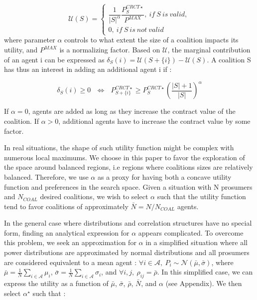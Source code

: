\documentclass[journal]{IEEEtran}
\begin{document}
\begin{equation}
\mathcal{U}(S) = \left\{ \begin{array}{lll}
							\dfrac{1}{|S|^{\alpha}} \dfrac{ P_{S}^{CRCT \star} }{P^{MAX}},\ if\ S\ is\ valid, \\
							0,\ if\ S\ is\ not\ valid
						 \end{array}
				  \right.
\end{equation}
where parameter $ \alpha $ controls to what extent the size of a coalition impacts its utility, and $ P^{MAX} $ is a normalizing factor. Based on $ \mathcal{U} $, the marginal contribution of an agent i can be expressed as $ \delta_{S}(i) = \mathcal{U}(S+\{i\}) - \mathcal{U}(S) $. A coalition S has thus an interest in adding an additional agent i if : 

\begin{equation}
\delta_{S}(i) \geq 0 \ \ \ \Leftrightarrow \ \ \ P_{S+\{i\}}^{CRCT \star} \geq P_{S}^{CRCT \star} \left( \dfrac{|S|+1}{|S|} \right)^{\alpha}
\label{eq:marginal_benefit}
\end{equation}

If $ \alpha = 0 $, agents are added as long as they increase the contract value of the coalition. If $ \alpha > 0 $, additional agents have to increase the contract value by some factor. 

In real situations, the shape of such utility function might be complex with numerous local maximums. We choose in this paper to favor the exploration of the space around balanced regions, i.e regions where coalitions sizes are relatively balanced. Therefore, we use $ \alpha $ as a proxy for having both a concave utility function and preferences in the search space. Given a situation with N prosumers and $ N_{COAL} $ desired coalitions, we wish to select $ \alpha $ such that the utility function tend to favor coalitions of approximately $ \bar{N}=N/N_{COAL} $ agents.

In the general case where distributions and correlation structures have no special form, finding an analytical expression for $ \alpha $ appears complicated. To overcome this problem, we seek an approximation for $ \alpha $ in a simplified situation where all power distributions are approximated by normal distributions and all prosumers are considered equivalent to a mean agent : $ \forall i \in \mathcal{A},\ P_i \sim \mathcal{N}(\bar{\mu}, \bar{\sigma}) $, where $ \bar{\mu} = \frac{1}{N} \sum_{i \in \mathcal{A}} \mu_i $, $ \bar{ \sigma } = \frac{1}{N} \sum_{i \in \mathcal{A}} \sigma_i $, and $\forall i,j,\ \rho_{ij} = \bar{\rho} $. In this simplified case, we can express the utility as a function of $ \bar{\mu} $, $ \bar{\sigma} $, $\bar{\rho} $, $ \bar{N} $, and $ \alpha $ (see Appendix). We then select $ \alpha^{\star} $ such that :
\end{document}
